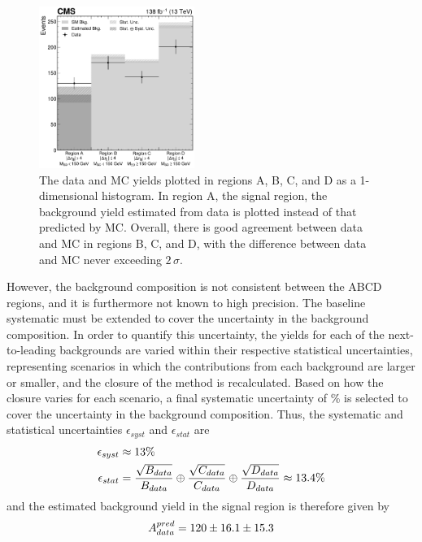 \begin{figure}[htb]
    \centering
    \includegraphics[width=0.45\textwidth]{fig/vbswh/regionsABCD_closure_unblinded.pdf}
    \caption{
        The data and MC yields plotted in regions A, B, C, and D as a 1-dimensional histogram. 
        In region A, the signal region, the background yield estimated from data is plotted instead of that predicted by MC. 
        Overall, there is good agreement between data and MC in regions B, C, and D, with the difference between data and MC never exceeding $2\,\sigma$. 
    }
    \label{fig:vbswh_abcd_closure}
\end{figure}
However, the background composition is not consistent between the ABCD regions, and it is furthermore not known to high precision. 
The baseline systematic must be extended to cover the uncertainty in the background composition. 
In order to quantify this uncertainty, the yields for each of the next-to-leading backgrounds are varied within their respective statistical uncertainties, representing scenarios in which the contributions from each background are larger or smaller, and the closure of the method is recalculated. 
Based on how the closure varies for each scenario, a final systematic uncertainty of \BkgEstTotalSystErr\% is selected to cover the uncertainty in the background composition. 
Thus, the systematic and statistical uncertainties $\epsilon_{syst}$ and $\epsilon_{stat}$ are
\begin{align*}
    \epsilon_{syst} &\approx 13\% \\
    \epsilon_{stat} &= \frac{\sqrt{B_{data}}}{B_{data}} \oplus \frac{\sqrt{C_{data}}}{C_{data}} \oplus \frac{\sqrt{D_{data}}}{D_{data}} \approx 13.4\%
\end{align*}
and the estimated background yield in the signal region is therefore given by 
\begin{equation*}
    A_{data}^{pred} = 120 \pm 16.1 \pm 15.3
\end{equation*}
